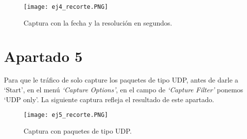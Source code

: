 \documentclass[12pt]{article}
\begin{document}
\begin{figure}[h!]
    \centering
    \texttt{[image: ej4\_recorte.PNG]}
    \caption{Captura con la fecha y la resolución en segundos.}
\end{figure}

\section{Apartado 5}
Para que le tráfico de solo capture los paquetes de tipo UDP, antes de darle a ‘Start’, en el menú \textit{‘Capture Options’}, en el campo de \textit{‘Capture Filter’} ponemos ‘UDP only’.
\newline
La siguiente captura refleja el resultado de este apartado.

\begin{figure}[h!]
    \centering
    \texttt{[image: ej5\_recorte.PNG]}
    \caption{Captura con paquetes de tipo UDP.}
\end{figure}
\end{document}
